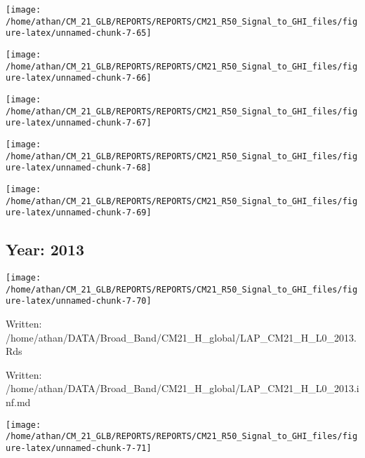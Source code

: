 \documentclass[
  11pt,
  a4paper,oneside]{article}
\begin{document}
\begin{center}\texttt{[image: /home/athan/CM\_21\_GLB/REPORTS/REPORTS/CM21\_R50\_Signal\_to\_GHI\_files/figure-latex/unnamed-chunk-7-65]} \end{center}

\begin{center}\texttt{[image: /home/athan/CM\_21\_GLB/REPORTS/REPORTS/CM21\_R50\_Signal\_to\_GHI\_files/figure-latex/unnamed-chunk-7-66]} \end{center}

\begin{center}\texttt{[image: /home/athan/CM\_21\_GLB/REPORTS/REPORTS/CM21\_R50\_Signal\_to\_GHI\_files/figure-latex/unnamed-chunk-7-67]} \end{center}

\begin{center}\texttt{[image: /home/athan/CM\_21\_GLB/REPORTS/REPORTS/CM21\_R50\_Signal\_to\_GHI\_files/figure-latex/unnamed-chunk-7-68]} \end{center}

\begin{center}\texttt{[image: /home/athan/CM\_21\_GLB/REPORTS/REPORTS/CM21\_R50\_Signal\_to\_GHI\_files/figure-latex/unnamed-chunk-7-69]} \end{center}

\FloatBarrier

\newpage

\hypertarget{year-2013}{%
\subsection{Year: 2013}\label{year-2013}}

\begin{center}\texttt{[image: /home/athan/CM\_21\_GLB/REPORTS/REPORTS/CM21\_R50\_Signal\_to\_GHI\_files/figure-latex/unnamed-chunk-7-70]} \end{center}

Written: /home/athan/DATA/Broad\_Band/CM21\_H\_global/LAP\_CM21\_H\_L0\_2013.Rds

Written: /home/athan/DATA/Broad\_Band/CM21\_H\_global/LAP\_CM21\_H\_L0\_2013.inf.md

\begin{center}\texttt{[image: /home/athan/CM\_21\_GLB/REPORTS/REPORTS/CM21\_R50\_Signal\_to\_GHI\_files/figure-latex/unnamed-chunk-7-71]} \end{center}
\end{document}
